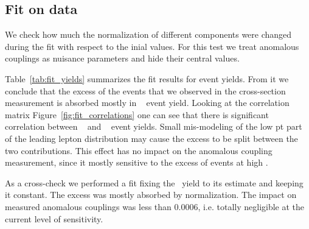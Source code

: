 \subsection{Fit on data}
We check how much the normalization of different components were
changed during the fit with respect to the inial values. For this test
we treat anomalous couplings as nuisance parameters and hide their
central values.

Table~\ref{tab:fit_yields} summarizes the fit results for event
yields. From it we conclude that the excess of the events that we
observed in the cross-section measurement is absorbed mostly
in \wjets~ event yield. Looking at the correlation matrix
Figure~\ref{fig:fit_correlations} one can see that there is
significant correlation between \wjets~ and \ww~ event yields. Small
mis-modeling of the low pt part of the leading lepton distribution may
cause the excess to be split between the two contributions. This
effect has no impact on the anomalous coupling measurement, since it
mostly sensitive to the excess of events at high \pt{}. 

As a cross-check we performed a fit fixing the \wjets\ yield to its
estimate and keeping it constant. The excess was mostly absorbed
by \ww normalization. The impact on measured anomalous couplings was
less than 0.0006, i.e. totally negligible at the current level of
sensitivity.

